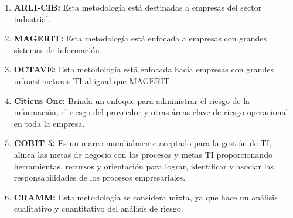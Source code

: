 \begin{enumerate}
\item {\bfseries ARLI-CIB:}
Esta metodología está destinadas a empresas del sector industrial.
\item {\bfseries MAGERIT:}
Esta metodología está enfocada a empresas con grandes sistemas de información.
\item {\bfseries OCTAVE:}
Esta metodología está enfocada hacía empresas con grandes infraestructuras TI al igual que MAGERIT.
\item {\bfseries Citicus One:}
Brinda un enfoque para administrar el riesgo de la información, el riesgo del proveedor y otras áreas clave de riesgo operacional en toda la empresa.
\item {\bfseries COBIT 5:}
Es un marco mundialmente aceptado para la gestión de TI, alinea las metas de negocio con los procesos y metas TI proporcionando herramientas, recursos y orientación para lograr, identificar y asociar las responsabilidades de los procesos  empresariales.
\item {\bfseries CRAMM:}
Esta metodología se considera mixta, ya que hace un análisis cualitativo y cuantitativo del análisis de riesgo.
\end{enumerate}



